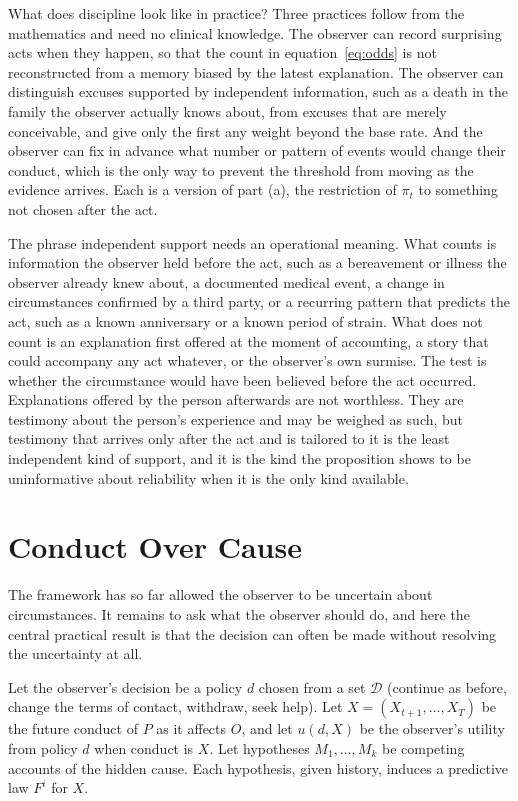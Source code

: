 \documentclass[11pt]{article}
\theoremstyle{definition}
\theoremstyle{remark}
\begin{document}
What does discipline look like in practice? Three practices follow from the mathematics and need no clinical knowledge. The observer can record surprising acts when they happen, so that the count in equation~\eqref{eq:odds} is not reconstructed from a memory biased by the latest explanation. The observer can distinguish excuses supported by independent information, such as a death in the family the observer actually knows about, from excuses that are merely conceivable, and give only the first any weight beyond the base rate. And the observer can fix in advance what number or pattern of events would change their conduct, which is the only way to prevent the threshold from moving as the evidence arrives. Each is a version of part (a), the restriction of $\pi_t$ to something not chosen after the act.

The phrase independent support needs an operational meaning. What counts is information the observer held before the act, such as a bereavement or illness the observer already knew about, a documented medical event, a change in circumstances confirmed by a third party, or a recurring pattern that predicts the act, such as a known anniversary or a known period of strain. What does not count is an explanation first offered at the moment of accounting, a story that could accompany any act whatever, or the observer's own surmise. The test is whether the circumstance would have been believed before the act occurred. Explanations offered by the person afterwards are not worthless. They are testimony about the person's experience and may be weighed as such, but testimony that arrives only after the act and is tailored to it is the least independent kind of support, and it is the kind the proposition shows to be uninformative about reliability when it is the only kind available.

\section{Conduct Over Cause}\label{sec:conduct}

The framework has so far allowed the observer to be uncertain about circumstances. It remains to ask what the observer should do, and here the central practical result is that the decision can often be made without resolving the uncertainty at all.

Let the observer's decision be a policy $d$ chosen from a set $\mathcal{D}$ (continue as before, change the terms of contact, withdraw, seek help). Let $X=(X_{t+1},\dots,X_T)$ be the future conduct of $P$ as it affects $O$, and let $u(d,X)$ be the observer's utility from policy $d$ when conduct is $X$. Let hypotheses $M_1,\dots,M_k$ be competing accounts of the hidden cause. Each hypothesis, given history, induces a predictive law $F^{i}$ for $X$.
\end{document}
